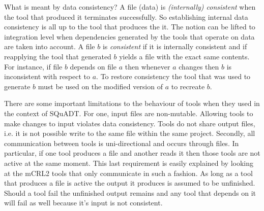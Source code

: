 \documentclass{article}
\newcommand{\squadt}{SQuADT\xspace}
\begin{document}
  What is meant by data consistency? A file (data) is \textit{(internally)
  consistent} when the tool that produced it terminates successfully. So
  establishing internal data consistency is all up to the tool that produces
  the it. The notion can be lifted to integration level when dependencies
  generated by the tools that operate on data are taken into account. A file
  $b$ is \textit{consistent} if it is internally consistent and if reapplying
  the tool that generated $b$ yields a file with the exact same contents.  For
  instance, if file $b$ depends on file $a$ then whenever $a$ changes then $b$
  is inconsistent with respect to $a$. To restore consistency the tool that was
  used to generate $b$ must be used on the modified version of $a$ to recreate
  $b$.

  There are some important limitations to the behaviour of tools when they used
  in the context of \squadt. For one, input files are non-mutable. Allowing
  tools to make changes to input violates data consistency. Tools do not share
  output files, i.e. it is not possible write to the same file within the same
  project. Secondly, all communication between tools is uni-directional and
  occurs through files.  In particular, if one tool produces a file and another
  reads it then those tools are not active at the same moment. This last
  requirement is easily explained by looking at the mCRL2 tools that only
  communicate in such a fashion. As long as a tool that produces a file is
  active the output it produces is assumed to be unfinished.  Should a tool
  fail the unfinished output remains and any tool that depends on it will fail
  as well because it's input is not consistent.
  

  
\end{document}
